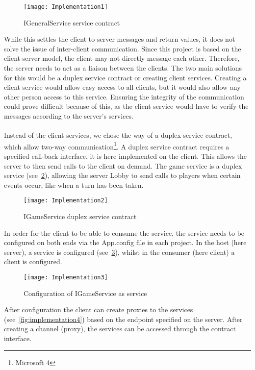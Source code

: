 \begin{figure}[h]
\centerline{\texttt{[image: Implementation1]}}
\caption {IGeneralService service contract}
\label {fig:implementation1}
\end{figure}

While this settles the client to server messages and return values, it does
 not solve the issue of inter-client communication. Since this project is
  based on the client-server model, the client may not directly message each
   other. Therefore, the server needs to act as a liaison between the clients.
    The two main solutions for this would be a duplex service contract or
    creating client services. Creating a client service would allow easy access
     to all clients, but it would also allow any other person access
      to this service. Ensuring the integrity of the communication could
       prove difficult because of this, as the client service would have
        to verify the messages according to the server’s services.
\\\\
Instead of the client services, we chose the way of a duplex service
contract, which allow two-way communication\footnote {Microsoft 4}. A
duplex service contract requires a specified call-back interface, it is
 here implemented on the client. This allows the server to then send calls
  to the client on demand. The game service is a duplex service
   (see~\ref{fig:implementation2}), allowing the server Lobby to send calls
    to players when certain events occur, like when a turn has been taken.

\begin{figure}[h]
\centerline{\texttt{[image: Implementation2]}}
\caption {IGameService duplex service contract}
\label {fig:implementation2}
\end{figure}
In order for the client to be able to consume the service, the service
needs to be configured on both ends via the App.config file in each project.
 In the host (here server), a service is configured
  (see~\ref{fig:implementation3}), whilst in the consumer
  (here client) a client is configured.

\begin{figure}[h]
\centerline{\texttt{[image: Implementation3]}}
\caption {Configuration of IGameService as service}
\label {fig:implementation3}
\end{figure}

After configuration the client can create proxies to the services
 (see~\ref{fig:implementation4}) based on the endpoint specified on the
  server. After creating a channel (proxy), the services can be accessed
   through the contract interface.

